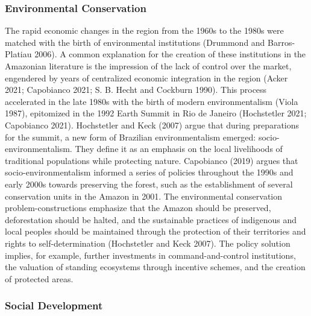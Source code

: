 \documentclass[
  12pt,
]{article}
\begin{document}
\hypertarget{environmental-conservation}{%
\subsubsection{Environmental
Conservation}\label{environmental-conservation}}

The rapid economic changes in the region from the 1960s to the 1980s
were matched with the birth of environmental institutions (Drummond and
Barros-Platiau 2006). A common explanation for the creation of these
institutions in the Amazonian literature is the impression of the lack
of control over the market, engendered by years of centralized economic
integration in the region (Acker 2021; Capobianco 2021; S. B. Hecht and
Cockburn 1990). This process accelerated in the late 1980s with the
birth of modern environmentalism (Viola 1987), epitomized in the 1992
Earth Summit in Rio de Janeiro (Hochstetler 2021; Capobianco 2021).
Hochstetler and Keck (2007) argue that during preparations for the
summit, a new form of Brazilian environmentalism emerged:
socio-environmentalism. They define it as an emphasis on the local
livelihoods of traditional populations while protecting nature.
Capobianco (2019) argues that socio-environmentalism informed a series
of policies throughout the 1990s and early 2000s towards preserving the
forest, such as the establishment of several conservation units in the
Amazon in 2001. The environmental conservation problem-constructions
emphasize that the Amazon should be preserved, deforestation should be
halted, and the sustainable practices of indigenous and local peoples
should be maintained through the protection of their territories and
rights to self-determination (Hochstetler and Keck 2007). The policy
solution implies, for example, further investments in
command-and-control institutions, the valuation of standing ecosystems
through incentive schemes, and the creation of protected areas.

\hypertarget{social-development}{%
\subsubsection{Social Development}\label{social-development}}
\end{document}

